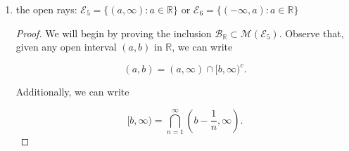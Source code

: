\documentclass[11pt,oneside,english]{amsart}
\theoremstyle{definition}
\newcommand{\R}{\mathbb{R}}
\newcommand{\MC}[1]{\mathcal{#1}}
\begin{document}
\begin{enumerate}
\begin{enumerate}
\begin{proof}
We will begin by proving the inclusion $\MC{B}_{\R}\subset\MC{M}(\MC{E}_3)$. Observe that, given any open interval $(a,b)$ in $\R$, we can write 

\[
(a,b)=\bigcup_{n=1}^\infty\left(a,b-\frac{1}{n}\right].
\]

The elements of this union are elements of $\MC{E}_3$ so $\MC{E}_1\subset\MC{M}(\MC{E}_3)$. Thus, by Lemma 1.1,

\[
\MC{M}(\MC{E}_3)\supset\MC{M}(\MC{E}_1)=\MC{B}_\R.
\]

Similarly, we can write

\[
(a,b)=\bigcup_{n=1}^\infty\left[a+\frac{1}{n},b\right).
\]

The elements of this union are elements of $\MC{E}_4$ so $\MC{E}_1\subset\MC{M}(\MC{E}_4)$. Thus, by Lemma 1.1,

\[
\MC{M}(\MC{E}_4)\supset\MC{M}(\MC{E}_1)=\MC{B}_\R.
\]

%
%
%
%
%
%

\end{proof}

\pagebreak

\item the open rays: $\MC{E}_5=\{(a,\infty):a\in \R\}$ or $\MC{E}_6=\{(-\infty,a):a\in \R\}$

\begin{proof}
We will begin by proving the inclusion $\MC{B}_{\R}\subset\MC{M}(\MC{E}_5)$. Observe that, given any open interval $(a,b)$ in $\R$, we can write 

\[
(a,b)=(a,\infty)\cap[b,\infty)^c.
\]

Additionally, we can write 

\[
[b,\infty)=\bigcap_{n=1}^\infty\left(b-\frac{1}{n},\infty\right).
\]


\end{proof}
\end{enumerate}
\end{enumerate}
\end{document}

